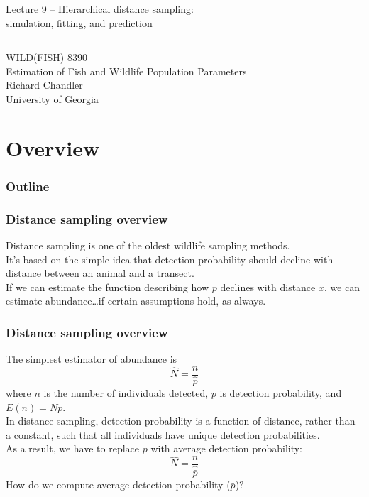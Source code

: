 \documentclass[color=usenames,dvipsnames]{beamer}\usepackage[]{graphicx}\usepackage[]{color}
\begin{document}
\begin{frame}[plain]
  \LARGE
  \centering
  {
    \LARGE Lecture 9 -- Hierarchical distance sampling: \\
    \Large simulation, fitting, and prediction %
  }
  {\color{default} \rule{\textwidth}{0.1pt} }
  \vfill
  \large
  WILD(FISH) 8390 \\
  Estimation of Fish and Wildlife Population Parameters \\
  \vfill
  \large
  Richard Chandler \\
  University of Georgia \\
\end{frame}






\section{Overview}



\begin{frame}[plain]
  \frametitle{Outline}
  \Large
\end{frame}



\begin{frame}
  \frametitle{Distance sampling overview}
  Distance sampling is one of the oldest wildlife sampling methods. \\
  \pause
  \vfill
  It's based on the simple idea that detection probability should
  decline with distance between an animal and a transect. \\
  \pause
  \vfill
  If we can estimate the function describing how $p$ declines with
  distance $x$, we can estimate abundance\dots \pause if certain
  assumptions hold, as always. \\
\end{frame}



\begin{frame}
  \frametitle{Distance sampling overview}
  The simplest estimator of abundance is 
  \[
    \hat{N} = \frac{n}{\hat{p}}
  \]
  where $n$ is the number of individuals detected, $p$ is detection
  probability, and $E(n)=Np$. \\
  \pause
  \vfill
  In distance sampling, detection probability is a \alert{function} of
  distance, rather than a constant, such that all individuals have
  unique detection probabilities. \\
  \pause
  \vfill
  As a result, we have to replace
  $p$ with \alert{average} detection probability:
  \[
    \hat{N} = \frac{n}{\hat{\bar{p}}}
  \]
  \pause
  \vfill
  How do we compute average detection probability ($\bar{p}$)?
\end{frame}
\end{document}
